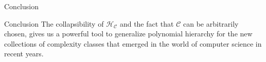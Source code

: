         \begin{frame}{Conclusion}
            \begin{block}{Conclusion}
                The collapsibility of $\mathcal{H}_{\mathcal{C}}$ and the fact that $\mathcal{C}$ 
                can be arbitrarily chosen, gives us a powerful tool to generalize polynomial hierarchy for 
                the new collections of complexity classes that emerged in the world of computer science in 
                recent years.
            \end{block}
        \end{frame}

